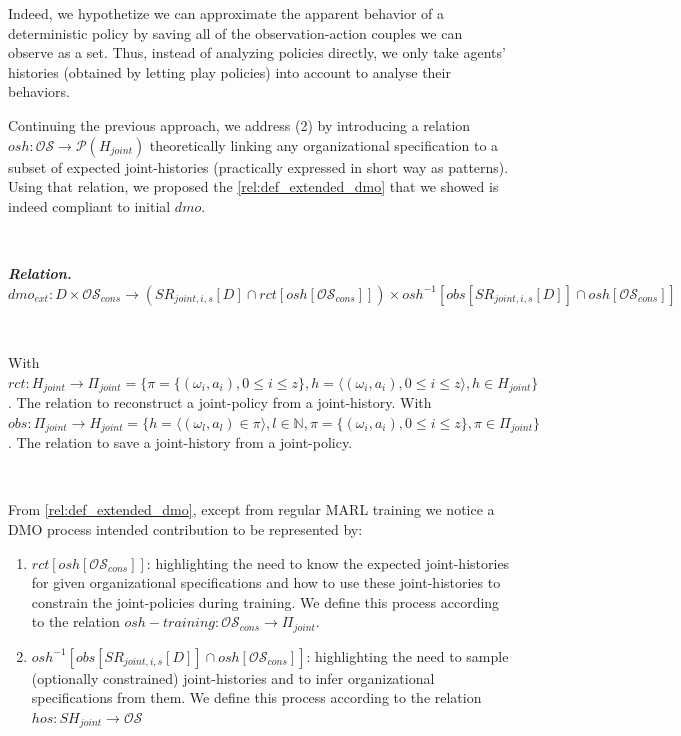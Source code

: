 \documentclass{ecai}
\newcounter{relation}
\renewcommand{\therelation}{\arabic{relation}}
\newenvironment{relation}[1][]{%
    \refstepcounter{relation}%
    \noindent \raggedright \textit{\textbf{Relation. \therelation}} \hfill$}
{%
$ \hfill \phantom{x}

}
\newcounter{proof}
\begin{document}
Indeed, we hypothetize we can approximate the apparent behavior of a deterministic policy by saving all of the observation-action couples we can observe as a set. Thus, instead of analyzing policies directly, we only take agents' histories (obtained by letting play policies) into account to analyse their behaviors.

Continuing the previous approach, we address (2) by introducing a relation $osh: \mathcal{OS} \rightarrow \mathcal{P}(H_{joint})$ theoretically linking any organizational specification to a subset of expected joint-histories (practically expressed in short way as patterns).
Using that relation, we proposed the \autoref{rel:def_extended_dmo} that we showed is indeed compliant to initial $dmo$.%

\

\begin{relation}\label{rel:def_extended_dmo}
    $\\\phantom{}$ dmo_{ext}: D \times \mathcal{OS}_{cons} \rightarrow (SR_{joint,i,s}[D] \cap rct[osh[\mathcal{OS}_{cons}]]) \times osh^{-1}[obs[SR_{joint,i,s}[D]] \cap osh[\mathcal{OS}_{cons}]]
\end{relation}

\

\noindent With $rct: H_{joint} \rightarrow \Pi_{joint} = \{\pi = \{(\omega_i, a_i), 0 \leq i \leq z\}, h = \langle (\omega_i, a_i), 0 \leq i \leq z \rangle, h \in H_{joint}\}$. The relation to reconstruct a joint-policy from a joint-history.
\noindent With $obs: \Pi_{joint} \rightarrow H_{joint} = \{h = \langle (\omega_l, a_l) \in \pi \rangle, l \in \mathbb{N}, \pi = \{ (\omega_i, a_i), 0 \leq i \leq z \}, \pi \in \Pi_{joint}\}$. The relation to save a joint-history from a joint-policy.

\

From \autoref{rel:def_extended_dmo}, except from regular MARL training we notice a DMO process intended contribution to be represented by:
\begin{enumerate}
    \item $rct[osh[\mathcal{OS}_{cons}]]$: highlighting the need to know the expected joint-histories for given organizational specifications and how to use these joint-histories to constrain the joint-policies during training. We define this process according to the relation $osh-training: \mathcal{OS}_{cons} \rightarrow \Pi_{joint}$.
    \item $osh^{-1}[obs[SR_{joint,i,s}[D]] \cap osh[\mathcal{OS}_{cons}]]$: highlighting the need to sample (optionally constrained) joint-histories and to infer organizational specifications from them. We define this process according to the relation $hos: SH_{joint} \rightarrow \mathcal{OS}$
\end{enumerate}
\end{document}
